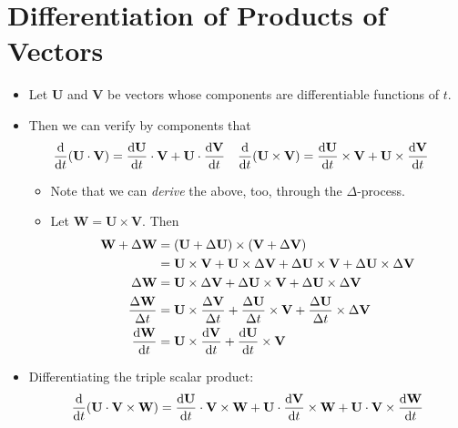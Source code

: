 \documentclass[../main.tex]{subfiles}
\begin{document}
\section{Differentiation of Products of Vectors}
\begin{itemize}
    \item Let $\textbf{U}$ and $\textbf{V}$ be vectors whose components are differentiable functions of $t$.
    \item Then we can verify by components that
    \begin{align*}
        \dv{t}(\textbf{U}\cdot\textbf{V}) &= \dv{\textbf{U}}{t}\cdot\textbf{V}+\textbf{U}\cdot\dv{\textbf{V}}{t}&
            \dv{t}(\textbf{U}\times\textbf{V}) &= \dv{\textbf{U}}{t}\times\textbf{V}+\textbf{U}\times\dv{\textbf{V}}{t}
    \end{align*}
    \begin{itemize}
        \item Note that we can \emph{derive} the above, too, through the $\Delta$-process.
        \item Let $\textbf{W}=\textbf{U}\times\textbf{V}$. Then
        \begin{align*}
            \textbf{W}+\Delta\textbf{W} &= (\textbf{U}+\Delta\textbf{U})\times(\textbf{V}+\Delta\textbf{V})\\
            &= \textbf{U}\times\textbf{V}+\textbf{U}\times\Delta\textbf{V}+\Delta\textbf{U}\times\textbf{V}+\Delta\textbf{U}\times\Delta\textbf{V}\\
            \Delta\textbf{W} &= \textbf{U}\times\Delta\textbf{V}+\Delta\textbf{U}\times\textbf{V}+\Delta\textbf{U}\times\Delta\textbf{V}\\
            \frac{\Delta\textbf{W}}{\Delta t} &= \textbf{U}\times\frac{\Delta\textbf{V}}{\Delta t}+\frac{\Delta\textbf{U}}{\Delta t}\times\textbf{V}+\frac{\Delta\textbf{U}}{\Delta t}\times\Delta\textbf{V}\\
            \dv{\textbf{W}}{t} &= \textbf{U}\times\dv{\textbf{V}}{t}+\dv{\textbf{U}}{t}\times\textbf{V}
        \end{align*}
    \end{itemize}
    \item Differentiating the triple scalar product:
    \begin{equation*}
        \dv{t}(\textbf{U}\cdot\textbf{V}\times\textbf{W}) = \dv{\textbf{U}}{t}\cdot\textbf{V}\times\textbf{W}+\textbf{U}\cdot\dv{\textbf{V}}{t}\times\textbf{W}+\textbf{U}\cdot\textbf{V}\times\dv{\textbf{W}}{t}
    \end{equation*}

\end{itemize}
\end{document}
